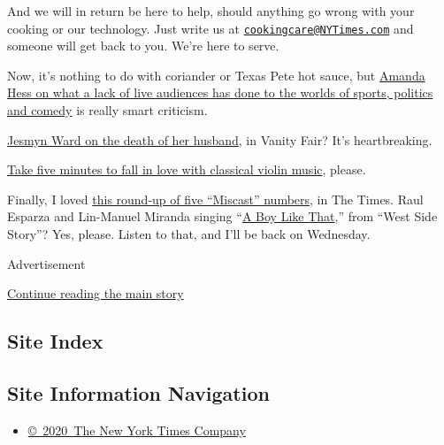 And we will in return be here to help, should anything go wrong with
your cooking or our technology. Just write us at
\href{mailto:cookingcare@NYTimes.com}{\nolinkurl{cookingcare@NYTimes.com}}
and someone will get back to you. We're here to serve.

Now, it's nothing to do with coriander or Texas Pete hot sauce, but
\href{https://www.nytimes3xbfgragh.onion/2020/09/04/arts/TV-shows-sports-audiences.html}{Amanda
Hess on what a lack of live audiences has done to the worlds of sports,
politics and comedy} is really smart criticism.

\href{https://www.vanityfair.com/culture/2020/08/jesmyn-ward-on-husbands-death-and-grief-during-covid}{Jesmyn
Ward on the death of her husband}, in Vanity Fair? It's heartbreaking.

\href{https://www.nytimes3xbfgragh.onion/2020/09/02/arts/music/five-minutes-classical-music-violin.html}{Take
five minutes to fall in love with classical violin music}, please.

Finally, I loved
\href{https://www.nytimes3xbfgragh.onion/2020/09/02/theater/5-miscast-musical-numbers.html}{this
round-up of five ``Miscast'' numbers}, in The Times. Raul Esparza and
Lin-Manuel Miranda singing
``\href{https://www.youtube.com/watch?v=NOoKi6q9ZXE\&feature=youtu.be}{A
Boy Like That},'' from ``West Side Story''? Yes, please. Listen to that,
and I'll be back on Wednesday.

Advertisement

\protect\hyperlink{after-bottom}{Continue reading the main story}

\hypertarget{site-index}{%
\subsection{Site Index}\label{site-index}}

\hypertarget{site-information-navigation}{%
\subsection{Site Information
Navigation}\label{site-information-navigation}}

\begin{itemize}
\tightlist
\item
  \href{https://help.nytimes3xbfgragh.onion/hc/en-us/articles/115014792127-Copyright-notice}{©~2020~The
  New York Times Company}
\end{itemize}

